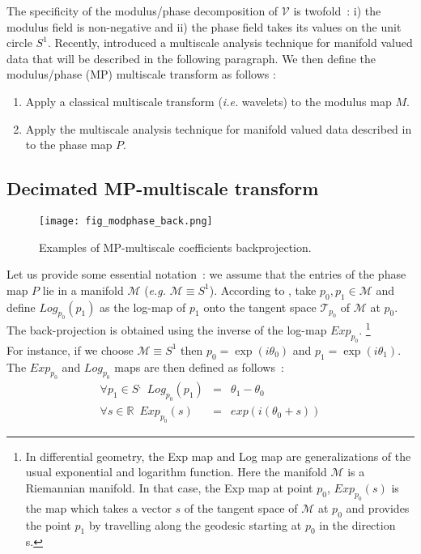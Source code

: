 The specificity of the modulus/phase decomposition of $\mathcal{V}$ is twofold~: i) the modulus field is non-negative and ii) the phase 
field takes its values on the unit circle $S^1$. Recently, \citep{rahman05} introduced a multiscale analysis technique for manifold valued 
data that will be described in the following paragraph. We then define the modulus/phase (MP) multiscale transform as follows \citep{starck:pola09}:
\vspace{.1cm}
\begin{center}
\begin{minipage}[b]{0.85\linewidth}
\footnotesize{
\begin{enumerate}
\item Apply a classical multiscale transform (\textit{i.e.} wavelets) to the modulus map $M$.
\item Apply the multiscale analysis technique for manifold valued data described in \citep{rahman05} to the phase map $P$. 
\end{enumerate}}
\end{minipage}
\end{center}
\vspace{.1cm}

\subsection{Decimated MP-multiscale transform}

\begin{figure*}[htb]
\centerline{
 \vbox{
 \texttt{[image: fig\_modphase\_back.png]}
 }
 }
\caption{Examples of MP-multiscale coefficients backprojection.}
\label{fig_modphase_back}
\end{figure*}
Let us provide some essential notation~: we assume that the entries of the phase map $P$ lie in a manifold $\mathcal{M}$ 
(\textit{e.g.} $\mathcal{M}\equiv S^1$). According to \citep{rahman05}, take $p_0,p_1 \in \mathcal{M}$ and define $Log_{p_0}(p_1)$ 
as the log-map of $p_1$ onto the tangent space $\mathcal{T}_{p_0}$ of $\mathcal{M}$ at $p_0$. The back-projection is obtained 
using the inverse of the log-map $Exp_{p_0}$. \footnote{In differential geometry, the Exp map and Log map are generalizations of 
the usual exponential and logarithm function. Here the manifold $\mathcal{M}$ is a Riemannian manifold. In that case, the Exp map 
at point $p_0$, $Exp_{p_0}(s)$ is the map which takes a vector $s$ of the tangent space of $\mathcal{M}$ at $p_0$ and provides the 
point $p_1$ by travelling along the geodesic starting at $p_0$ in the direction s.}\\
For instance, if we choose $\mathcal{M} \equiv S^1$ then $p_0 = \exp(i \theta_0)$ and $p_1 = \exp(i \theta_1)$. The $Exp_{p_0}$ and 
$Log_{p_0}$ maps are then defined as follows~:
\begin{eqnarray}
\forall p_1 \in S^, \,\,\,  Log_{p_0} (p_1) & = & \theta_1 - \theta_0 \\
\forall s \in \mathbb{R} \,\,\, Exp_{p_0} (s) & = & exp(i(\theta_0 + s))
\end{eqnarray}

